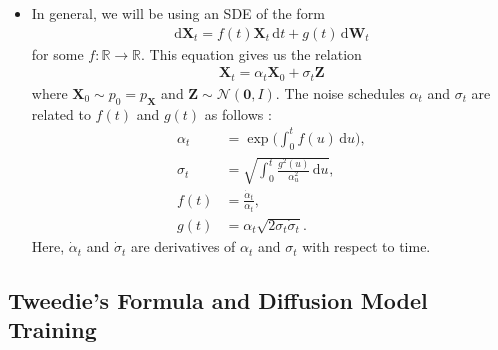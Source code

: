 \documentclass[10pt]{article}
\newcommand{\dee}{\mathrm{d}}
\newcommand{\ve}[1]{\mathbf{#1}}
\newcommand{\ra}{\rightarrow}
\newcommand{\mcal}[1]{\mathcal{#1}}
\newcommand{\Real}{\mathbb{R}}
\begin{document}
\begin{itemize}
  \item In general, we will be using an SDE of the form
  \begin{align*}
    \dee \ve{X}_t = f(t) \ve{X}_t\, \dee t + g(t)\, \dee\ve{W}_t
  \end{align*}
  for some $f: \Real \ra \Real$. This equation gives us the relation
  \begin{align}
    \ve{X}_t = \alpha_t \ve{X}_0 + \sigma_t \ve{Z} \label{eqn:diffusion-random-vars}
  \end{align}
  where $\ve{X}_0 \sim p_0 = p_\ve{X}$ and $\ve{Z} \sim \mcal{N}(\ve{0},I)$. The noise schedules $\alpha_t$ and $\sigma_t$ are related to $f(t)$ and $g(t)$ as follows \cite{Karras:EDM:2022}:
  \begin{align*}
    \alpha_t &= \exp\bigg( \int_0^t f(u)\, \dee u \bigg), \\
    \sigma_t &= \sqrt{\int_0^t \frac{g^2(u)}{\alpha_u^2}\, \dee u }, \\
    f(t) &= \frac{\dot{\alpha}_t}{\alpha_t}, \\
    g(t) &= \alpha_t \sqrt{2 \sigma_t \dot{\sigma}_t}.
  \end{align*}
  Here, $\dot{\alpha}_t$ and $\dot{\sigma}_t$ are derivatives of $\alpha_t$ and $\sigma_t$ with respect to time.
\end{itemize}

\subsection{Tweedie's Formula and Diffusion Model Training}
\end{document}
